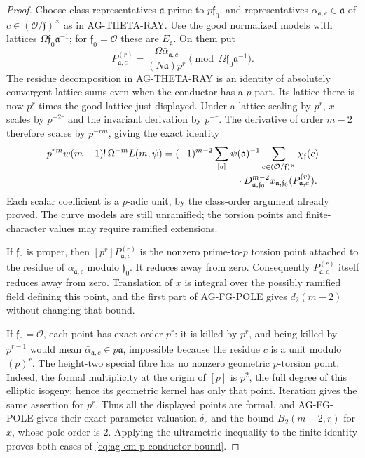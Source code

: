 \begin{proof}
Choose class representatives $\mathfrak a$ prime to
$p\mathfrak f_0$, and representatives
$\alpha_{\mathfrak a,c}\in\mathfrak a$ of
$c\in(\mathcal O/\mathfrak f)^\times$ as in AG-THETA-RAY.
Use the good normalized models with lattices
$\Omega\bar{\mathfrak f}_0\mathfrak a^{-1}$; for
$\mathfrak f_0=\mathcal O$ these are $E_{\mathfrak a}$.
On them put
\[
 P^{(r)}_{\mathfrak a,c}
   =\frac{\Omega\bar\alpha_{\mathfrak a,c}}
                    {(N\mathfrak a)p^r}
       \pmod{\Omega\bar{\mathfrak f}_0\mathfrak a^{-1}}.
\]
The residue decomposition in AG-THETA-RAY is an identity of
absolutely convergent lattice sums even when the conductor has
a $p$-part. Its lattice there is now $p^r$ times the good
lattice just displayed. Under a lattice scaling by $p^r$,
$x$ scales by $p^{-2r}$ and the invariant derivation by
$p^{-r}$. The derivative of order $m-2$ therefore scales by
$p^{-rm}$, giving the exact identity
\[
 \begin{aligned}
 p^{rm}w(m-1)!\,\Omega^{-m}L(m,\psi)
 ={}&(-1)^{m-2}\sum_{[\mathfrak a]}\psi(\mathfrak a)^{-1}
    \sum_{c\in(\mathcal O/\mathfrak f)^\times}
       \chi_{\mathfrak f}(c)\\[-2pt]
 &\hspace{22mm}\cdot
       D_{\mathfrak a,\mathfrak f_0}^{m-2}
          x_{\mathfrak a,\mathfrak f_0}
                (P^{(r)}_{\mathfrak a,c}).
 \end{aligned}
\]
Each scalar coefficient is a $p$-adic unit, by the class-order
argument already proved. The curve models are still unramified;
the torsion points and finite-character values may require
ramified extensions.

If $\mathfrak f_0$ is proper, then
$[p^r]P^{(r)}_{\mathfrak a,c}$ is the nonzero prime-to-$p$
torsion point attached to the residue of
$\alpha_{\mathfrak a,c}$ modulo $\mathfrak f_0$.
It reduces away from zero. Consequently
$P^{(r)}_{\mathfrak a,c}$ itself reduces away from zero.
Translation of $x$ is integral over the possibly ramified
field defining this point, and the first part of AG-FG-POLE
gives $d_2(m-2)$ without changing that bound.

If $\mathfrak f_0=\mathcal O$, each point has exact order
$p^r$: it is killed by $p^r$, and being killed by $p^{r-1}$
would mean $\bar\alpha_{\mathfrak a,c}\in p\bar{\mathfrak a}$,
impossible because the residue $c$ is a unit modulo $(p)^r$.
The height-two special fibre has no nonzero geometric
$p$-torsion point. Indeed, the formal multiplicity at the
origin of $[p]$ is $p^2$, the full degree of this elliptic
isogeny; hence its geometric kernel has only that point.
Iteration gives the same assertion for $p^r$.
Thus all the displayed points are formal, and AG-FG-POLE gives
their exact parameter valuation $\delta_r$ and the bound
$B_2(m-2,r)$ for $x$, whose pole order is $2$.
Applying the ultrametric inequality to the finite identity
proves both cases of \eqref{eq:ag-cm-p-conductor-bound}.
\end{proof}

